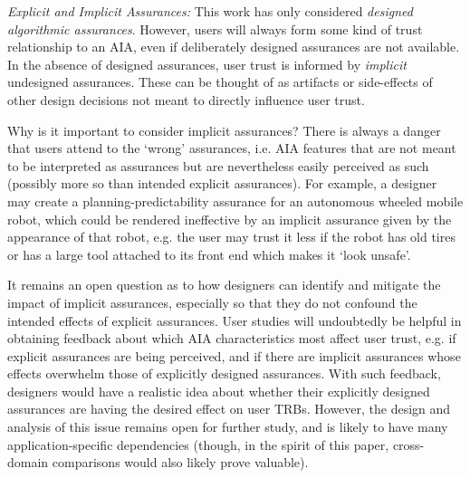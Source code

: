 \emph{Explicit and Implicit Assurances:}
This work has only considered \emph{designed algorithmic assurances}. However, users will always form some kind of trust relationship to an AIA, even if deliberately designed assurances are not available. In the absence of designed assurances, user trust is informed by \emph{implicit} undesigned assurances. These can be thought of as artifacts or side-effects of other design decisions not meant to directly influence user trust.

Why is it important to consider implicit assurances? There is always a danger that users attend to the `wrong' assurances, i.e. AIA features that are not meant to be interpreted as assurances but are nevertheless easily perceived as such (possibly more so than intended explicit assurances). For example, a designer may create a planning-predictability assurance for an autonomous wheeled mobile robot, which could be rendered ineffective by an implicit assurance given by the appearance of that robot, e.g. the user may trust it less if the robot has old tires or has a large tool attached to its front end which makes it `look unsafe'. 

It remains an open question as to how designers can identify and mitigate the impact of implicit assurances, especially so that they do not confound the intended effects of explicit assurances. 
User studies will undoubtedly be helpful in obtaining feedback about which AIA characteristics most affect user trust, e.g. if explicit assurances are being perceived, and if there are implicit assurances whose effects overwhelm those of explicitly designed assurances. With such feedback, designers would have a realistic idea about whether their explicitly designed assurances are having the desired effect on user TRBs. 
However, the design and analysis of this issue remains open for further study, and is likely to have many application-specific dependencies (though, in the spirit of this paper, cross-domain comparisons would also likely prove valuable). 
